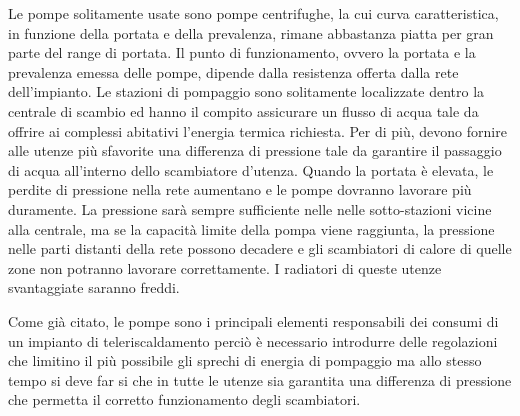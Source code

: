 \documentclass[laurea,oneside,11pt]{USiena_tesiLM}
\begin{document}
Le pompe solitamente usate sono pompe centrifughe, la cui curva caratteristica, in funzione della portata e della prevalenza, rimane abbastanza piatta per gran parte del range di portata. 
Il punto di funzionamento, ovvero la portata e la prevalenza emessa delle pompe, dipende dalla resistenza offerta dalla rete dell'impianto. 
Le stazioni di pompaggio sono solitamente localizzate dentro la centrale di scambio ed hanno il compito assicurare un flusso di acqua tale da offrire ai complessi abitativi l'energia termica richiesta. Per di più, devono fornire alle utenze più sfavorite una differenza di pressione tale da garantire il passaggio di acqua all'interno dello scambiatore d'utenza. 
Quando la portata è elevata, le perdite di pressione nella rete aumentano e le pompe dovranno lavorare più duramente. La pressione sarà sempre sufficiente nelle nelle sotto-stazioni vicine alla centrale, ma se la capacità limite della pompa viene raggiunta, la pressione nelle parti distanti della rete  possono decadere e gli scambiatori di calore di quelle zone non potranno lavorare correttamente. I radiatori di queste utenze svantaggiate saranno freddi.

Come già citato, le pompe sono i principali elementi responsabili dei consumi di un impianto di teleriscaldamento perciò è necessario introdurre delle regolazioni che limitino il più possibile gli sprechi di energia di pompaggio ma allo stesso tempo si deve far si che in tutte le utenze sia garantita una differenza di pressione che permetta il corretto funzionamento degli scambiatori. 
\end{document}
